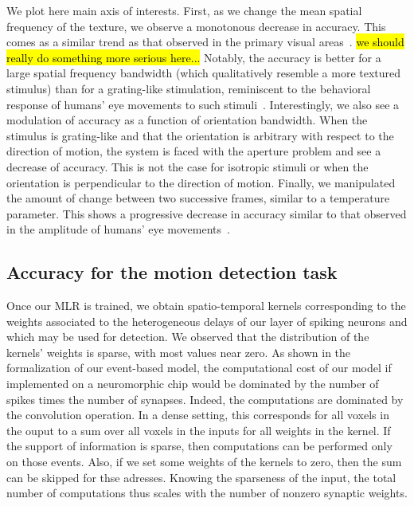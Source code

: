 \documentclass[default]{sn-jnl}%
\theoremstyle{thmstyleone}%
\theoremstyle{thmstyletwo}%
\theoremstyle{thmstylethree}%
\newcommand{\note}[1]{{\sethlcolor{yellow}\hl{#1}}}
\begin{document}
We plot here main axis of interests. First, as we change the mean spatial frequency of the texture, we observe a monotonous decrease in accuracy. This comes as a similar trend as that observed in the primary visual areas~\citep{priebe_tuning_2006}. \note{we should really do something more serious here...} Notably, the accuracy is better for a large spatial frequency bandwidth (which qualitatively resemble a more textured stimulus) than for a grating-like stimulation, reminiscent to the behavioral response of humans' eye movements to such stimuli~\citep{simoncini_more_2012}. Interestingly, we also see a modulation of accuracy as a function of orientation bandwidth. When the stimulus is grating-like and that the orientation is arbitrary with respect to the direction of motion, the system is faced with the aperture problem and see a decrease of accuracy. This is not the case for isotropic stimuli or when the orientation is perpendicular to the direction of motion. Finally, we manipulated the amount of change between two successive frames, similar to a temperature parameter. This shows a progressive decrease in accuracy similar to that observed in the amplitude of humans' eye movements~\citep{mansour_pour_speed_2018}.
%
\subsection{Accuracy for the motion detection task}

Once our MLR is trained, we obtain spatio-temporal kernels corresponding to the weights associated to the heterogeneous delays of our layer of spiking neurons and which may be used for detection. We observed that the distribution of the kernels' weights is sparse, with most values near zero. As shown in the formalization of our event-based model, the computational cost of our model if implemented on a neuromorphic chip would be dominated by the number of spikes times the number of synapses. Indeed, the computations are dominated by the convolution operation. In a dense setting, this corresponds for all voxels in the ouput to a sum over all voxels in the inputs for all weights in the kernel. If the support of information is sparse, then computations can be performed only on those events. Also, if we set some weights of the kernels to zero, then the sum can be skipped for thse adresses. Knowing the sparseness of the input, the total number of computations thus scales with the number of nonzero synaptic weights. 
\end{document}
